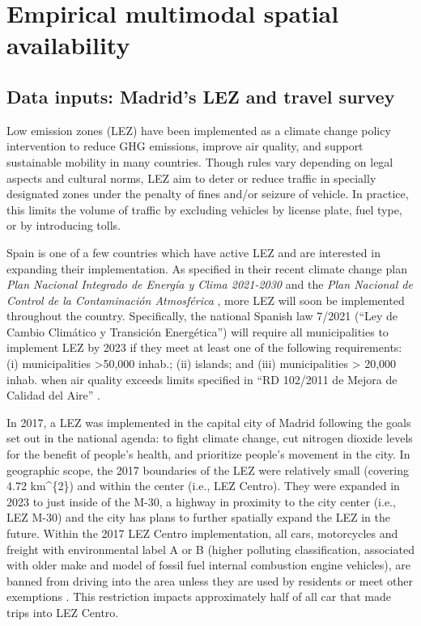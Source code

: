 \documentclass[numbered]{trbunofficial}
\begin{document}
\hypertarget{empirical-multimodal-spatial-availability}{%
\section{Empirical multimodal spatial
availability}\label{empirical-multimodal-spatial-availability}}

\hypertarget{data-inputs-madrids-lez-and-travel-survey}{%
\subsection{Data inputs: Madrid's LEZ and travel
survey}\label{data-inputs-madrids-lez-and-travel-survey}}

Low emission zones (LEZ) have been implemented as a climate change
policy intervention to reduce GHG emissions, improve air quality, and
support sustainable mobility in many countries. Though rules vary
depending on legal aspects and cultural norms, LEZ aim to deter or
reduce traffic in specially designated zones under the penalty of fines
and/or seizure of vehicle. In practice, this limits the volume of
traffic by excluding vehicles by license plate, fuel type, or by
introducing tolls.

Spain is one of a few countries which have active LEZ and are interested
in expanding their implementation. As specified in their recent climate
change plan \emph{Plan Nacional Integrado de Energía y Clima 2021-2030}
\citep{espanaPlanNacionalIntegrado2020} and the \emph{Plan Nacional de
Control de la Contaminación Atmosférica}
\citep{espanaResolucion10Enero2020}, more LEZ will soon be implemented
throughout the country. Specifically, the national Spanish law 7/2021
(``Ley de Cambio Climático y Transición Energética'') will require all
municipalities to implement LEZ by 2023 if they meet at least one of the
following requirements: (i) municipalities \textgreater50,000 inhab.;
(ii) islands; and (iii) municipalities \textgreater{} 20,000 inhab. when
air quality exceeds limits specified in ``RD 102/2011 de Mejora de
Calidad del Aire'' \citep{barcelonaGUIATECNICAPARA2021}.

In 2017, a LEZ was implemented in the capital city of Madrid following
the goals set out in the national agenda: to fight climate change, cut
nitrogen dioxide levels for the benefit of people's health, and
prioritize people's movement in the city. In geographic scope, the 2017
boundaries of the LEZ were relatively small (covering 4.72 km\^{}\{2\})
and within the center (i.e., LEZ Centro). They were expanded in 2023 to
just inside of the M-30, a highway in proximity to the city center
(i.e., LEZ M-30) and the city has plans to further spatially expand the
LEZ in the future. Within the 2017 LEZ Centro implementation, all cars,
motorcycles and freight with environmental label A or B (higher
polluting classification, associated with older make and model of fossil
fuel internal combustion engine vehicles), are banned from driving into
the area unless they are used by residents or meet other exemptions
\citep{tarrinoortizAnalyzingImpactLow2022}. This restriction impacts
approximately half of all car that made trips into LEZ Centro.
\end{document}
